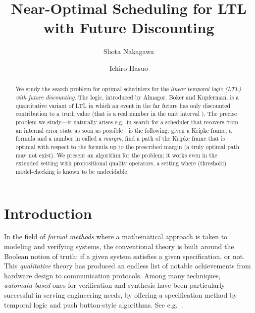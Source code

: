 \documentclass[a4paper,USenglish,numberwithinsect]{lipics}
\title{Near-Optimal Scheduling  for
 LTL with Future Discounting}
\author{Shota Nakagawa}
\author{Ichiro Hasuo}
\affil{Department of  Computer Science, The University of Tokyo
}
\theoremstyle{definition}
\theoremstyle{remark}
\theoremstyle{plain}
\begin{document}
\maketitle              

 \begin{abstract}
  We study the search problem for optimal schedulers for the \emph{linear temporal
  logic (LTL) with future discounting}.  The logic, introduced by
  Almagor, Boker and Kupferman, is a quantitative variant of LTL in
  which an event in the far future has only discounted contribution to a
  truth value (that is a real number in the unit interval ). The
  precise problem we study---it naturally arises e.g.\ in search for a
  scheduler that recovers from an internal error state as soon as
  possible---is the following: given a Kripke frame, a formula and a
  number in  called a \emph{margin}, find a path of the Kripke
  frame that is optimal with respect to the formula up to the prescribed
  margin (a truly optimal path may not exist). We present an algorithm
  for the problem; it works even in the extended setting with 
  propositional quality operators, a setting where (threshold)
  model-checking is known to be undecidable.
















  


  





  




  




\end{abstract}







\section{Introduction}\label{sec:intro}
In the field of \emph{formal methods} where a mathematical approach is
taken to modeling and verifying systems, the conventional theory
is built around the Boolean notion of truth: if a given system
satisfies a given specification, or not. This \emph{qualitative} theory
has produced an endless list of notable achievements from hardware
design to communication protocols. Among many techniques,
\emph{automata-based} ones for verification and synthesis have been
particularly successful in serving engineering needs, by offering 
a specification method by temporal logic and  push button-style
algorithms. See e.g.~\cite{Vardi96anautomata-theoretic,PnueliR89}.
\end{document}
